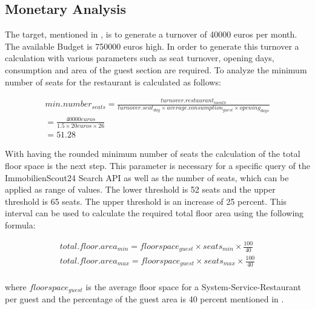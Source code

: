 \subsection{Monetary Analysis}
\label{subsec:moneten}
The target, mentioned in , is to generate a turnover of 40000 euros per month. The available Budget
 is 750000 euros high. In order to generate this turnover a calculation with various parameters such as seat turnover,
 opening days, consumption and area of the guest section are required. To analyze the minimum number of seats for the
 restaurant is calculated as follows:
\begin{center}
\begin{equation}
\begin{aligned}
	min.number_{seats} = \frac{turnover.restaurant_{month}}{turnover.seat_{day} \times average.consumption_{guest} \times opening_{days}} \\
	= \frac{40000 euros}{1.5 \times 20 euros \times 26} \\
	= 51.28
\end{aligned}
\label{eq:number_seats_benchmark}
\end{equation}
\end{center}

With having the rounded minimum number of seats the calculation of the total floor space is the next step. This parameter is
 necessary for a specific query of the ImmobilienScout24 Search API \cite{ImmoScout} as well as the number of seats,
 which can be applied as range of values. The lower threshold is 52 seats and the upper threshold is 65 seats. The upper
 threshold is an increase of 25 percent. This interval can be used to calculate the required total floor area using the
 following formula:

\begin{equation}
\begin{aligned}
	total.floor.area_{min} = floorspace_{guest} \times seats_{min} \times \frac{100}{40} \\
	total.floor.area_{max} = floorspace_{guest} \times seats_{max} \times \frac{100}{40} \\
\end{aligned}
\label{eq:total_floor_space}
\end{equation}

where $floorspace_{guest}$ is the average floor space for a System-Service-Restaurant per guest \cite{FlaecheGast} and the
 percentage of the guest area is 40 percent mentioned in \cite{FlaecheGastronomie}.


